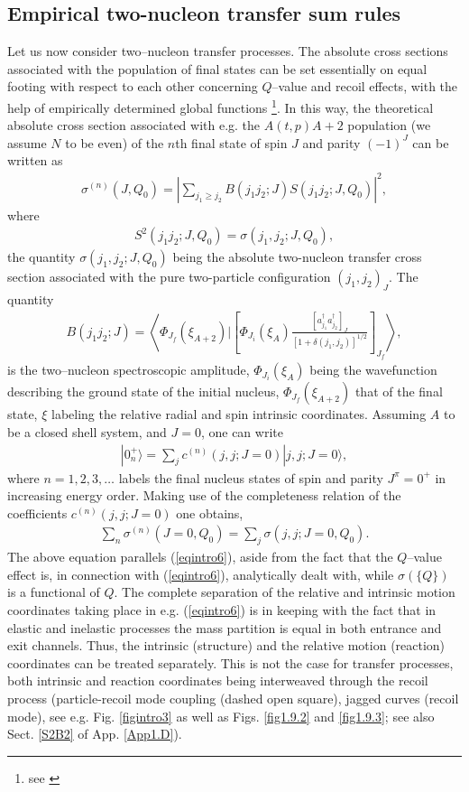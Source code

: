 \subsection{Empirical two-nucleon transfer sum rules}\label{S2.2.1}
Let us now consider two--nucleon transfer  processes. The  absolute cross sections associated with the population of  final states can be set essentially on equal footing with respect to each other  concerning  $Q$--value and recoil effects, with the help of empirically determined global functions \footnote{see \cite{Broglia:72b}}. In this way, the theoretical absolute cross section associated with e.g. the $A(t,p)A+2$ population (we assume $N$ to be even) of the $n$th final state of spin $J$ and parity $(-1)^J$ can be written as 
\begin{align}
\sigma^{(n)}(J,Q_0)=\left|\sum_{j_1\geq j_2}B(j_1 j_2;J)S(j_1 j_2 ;J,Q_0)\right|^2,
\end{align}
where
\begin{align}
S^2(j_1 j_2 ;J,Q_0)=\sigma(j_1,j_2;J,Q_0),
\end{align}
the quantity $\sigma(j_1,j_2;J,Q_0)$ being the absolute two-nucleon transfer cross section associated with the pure two-particle configuration $(j_1,j_2)_J$.
The quantity
\begin{align}
B(j_1j_2;J)=\left\langle \Phi_{J_f}(\xi_{A+2})|\left[\Phi_{J_i}(\xi_A)\frac{\left[a^\dagger_{j_1}a^\dagger_{j_2}\right]_J}{\left[1+\delta(j_1,j_2)\right]^{1/2}}\right]_{J_f}\right\rangle,
\end{align}
is the two--nucleon spectroscopic amplitude, $\Phi_{J_i}(\xi_A)$ being the wavefunction describing the ground state of the initial nucleus, $\Phi_{J_f}(\xi_{A+2})$ that of the final state, $\xi$ labeling the relative radial and spin intrinsic coordinates. Assuming $A$ to be a closed shell system, and $J=0$, one can write
\begin{align}
|0^+_n\rangle=\sum_{j}c^{(n)}(j,j;J=0)|j,j;J=0\rangle,
\end{align}
where $n=1,2,3,\dots$ labels the final nucleus states of spin and parity $J^\pi=0^+$ in increasing energy order. Making use of the completeness relation of the coefficients $c^{(n)}(j,j;J=0)$ one obtains,
\begin{align}\label{eqintro12}
\sum_n \sigma^{(n)}(J=0,Q_0)=\sum_j\sigma(j,j;J=0,Q_0).
\end{align}
The above equation parallels (\ref{eqintro6}), aside from the fact that the $Q$--value effect is, in connection with (\ref{eqintro6}), analytically dealt with, while $\sigma(\{Q\})$ is a functional of $Q$. The complete separation of the relative and intrinsic motion coordinates taking place in e.g. (\ref{eqintro6}) is in keeping with the fact that in elastic and inelastic processes the mass partition is equal in both entrance and exit channels. Thus, the intrinsic (structure) and the relative motion (reaction) coordinates can be treated separately. This is not the case for transfer processes, both intrinsic and reaction coordinates being interweaved through the recoil process (particle-recoil mode coupling (dashed open square),  jagged curves (recoil mode), see e.g.  Fig.  \ref{figintro3} as well as Figs. \ref{fig1.9.2} and \ref{fig1.9.3}; see also Sect. \ref{S2B2} of App. \ref{App1.D}). 
